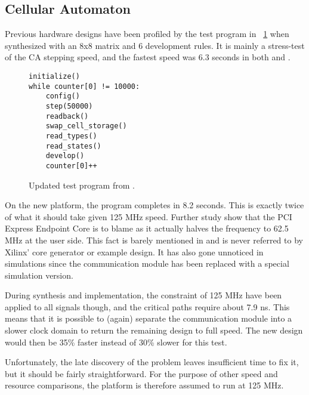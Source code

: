
\subsection{Cellular Automaton}

Previous hardware designs have been profiled by the test program in \figurename~\ref{fig:test-program} when synthesized with an 8x8 matrix and 6 development rules.
It is mainly a stress-test of the CA stepping speed, and the fastest speed was 6.3 seconds in both \cite{djupdal2003sblock} and \cite{stovneng2014sblock}.

\begin{figure}[!ht]
\begin{lstlisting}[xleftmargin=0.34\textwidth]
initialize()
while counter[0] != 10000:
    config()
    step(50000)
    readback()
    swap_cell_storage()
    read_types()
    read_states()
    develop()
    counter[0]++
\end{lstlisting}
\caption[Test program] {
    Updated test program from \cite{djupdal2003sblock}.
}
\label{fig:test-program}
\end{figure}

On the new platform, the program completes in 8.2 seconds.
This is exactly twice of what it should take given 125 MHz speed.
Further study show that the PCI Express Endpoint Core is to blame as it actually halves the frequency to 62.5 MHz at the user side.
This fact is barely mentioned in \cite{ug672} and is never referred to by Xilinx' core generator or example design.
It has also gone unnoticed in simulations since the communication module has been replaced with a special simulation version.

During synthesis and implementation, the constraint of 125 MHz have been applied to all signals though, and the critical paths require about 7.9 ns.
This means that it is possible to (again) separate the communication module into a slower clock domain to return the remaining design to full speed.
The new design would then be 35\% faster instead of 30\% slower for this test.

Unfortunately, the late discovery of the problem leaves insufficient time to fix it, but it should be fairly straightforward.
For the purpose of other speed and resource comparisons, the platform is therefore assumed to run at 125 MHz.


